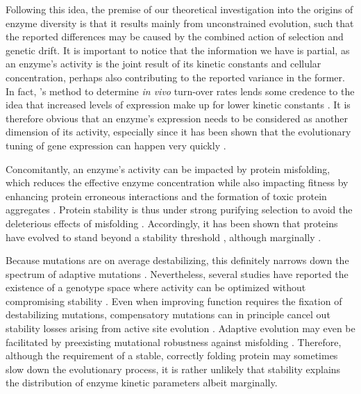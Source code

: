 \documentclass[11pt,onecolumn]{article}
\begin{document}
Following this idea, the premise of our theoretical investigation into the origins of enzyme diversity is that it results mainly from unconstrained evolution, such that the reported differences may be caused by the combined action of selection and genetic drift. It is important to notice that the information we have is partial, as an enzyme's activity is the joint result of its kinetic constants and cellular concentration, perhaps also contributing to the reported variance in the former. In fact, \citet{Davidi16}'s method to determine \textit{in vivo} turn-over rates lends some credence to the idea that increased levels of expression make up for lower kinetic constants \citep{Davidi18}. It is therefore obvious that an enzyme's expression needs to be considered as another dimension of its activity, especially since it has been shown that the evolutionary tuning of gene expression can happen very quickly \citep{Dekel05}.

Concomitantly, an enzyme's activity can be impacted by protein misfolding, which reduces the effective enzyme concentration \citep{Tokuriki09,Yue05,Drummond05,Echave17a} while also impacting fitness by enhancing protein erroneous interactions \citep{Yang12} and the formation of toxic protein aggregates \citep{Bucciantini02,Sabate10,Geiler-Samerotte11}. Protein stability is thus under strong purifying selection to avoid the deleterious effects of misfolding \citep{Drummond08}. Accordingly, it has been shown that proteins have evolved to stand beyond a stability threshold \citep{Bloom05}, although marginally \citep{Taverna02}. 

Because mutations are on average destabilizing, this definitely narrows down the spectrum of adaptive mutations \citep{Shoichet95,DePristo05, Weinreich06,Tokuriki07,Tokuriki08, Lunzer10}. Nevertheless, several studies have reported the existence of a genotype space where activity can be optimized without compromising stability \citep{Schreiber94,Burg02,Bloom04,Knies17,Miller17}. Even when improving function requires the fixation of destabilizing mutations, compensatory mutations can in principle cancel out stability losses arising from active site evolution \citep{DePristo05,Tokuriki08,Tokuriki09,Storz18}. Adaptive evolution may even be facilitated by preexisting mutational robustness against misfolding \citep{Bloom06,Bloom07}. Therefore, although the requirement of a stable, correctly folding protein may sometimes slow down the evolutionary process, it is rather unlikely that stability explains the distribution of enzyme kinetic parameters albeit marginally.\\
\end{document}
